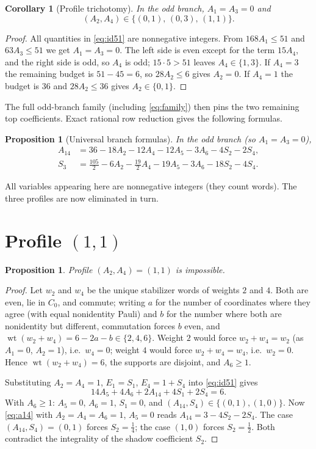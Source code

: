 \documentclass[11pt]{amsart}
\newtheorem{proposition}[theorem]{Proposition}
\newtheorem{corollary}[theorem]{Corollary}
\theoremstyle{definition}
\theoremstyle{remark}
\DeclareMathOperator{\wt}{wt}
\begin{document}
\begin{corollary}[Profile trichotomy]\label{cor:profiles}
In the odd branch, $A_1=A_3=0$ and
\[
(A_2,A_4)\in\{(0,1),\,(0,3),\,(1,1)\} .
\]
\end{corollary}

\begin{proof}
All quantities in \eqref{eq:id51} are nonnegative integers.  From
$168A_1\le 51$ and $63A_3\le 51$ we get $A_1=A_3=0$.  The left side is
even except for the term $15A_4$, and the right side is odd, so $A_4$ is
odd; $15\cdot 5>51$ leaves $A_4\in\{1,3\}$.  If $A_4=3$ the remaining
budget is $51-45=6$, so $28A_2\le6$ gives $A_2=0$.  If $A_4=1$ the budget
is $36$ and $28A_2\le 36$ gives $A_2\in\{0,1\}$.
\end{proof}

The full odd-branch family (including \eqref{eq:family}) then pins the two
remaining top coefficients.  Exact rational row reduction gives the following formulas.

\begin{proposition}[Universal branch formulas]\label{prop:universal}
In the odd branch (so $A_1=A_3=0$),
\begin{align}
A_{14}&=36-18A_2-12A_4-12A_5-3A_6-4S_2-2S_4 , \label{eq:a14}\\
S_3&=\tfrac{105}{2}-6A_2-\tfrac{19}{2}A_4-19A_5-3A_6-18S_2-4S_4 .
\label{eq:s3}
\end{align}
\end{proposition}

All variables appearing here are nonnegative integers (they count words).
The three profiles are now eliminated in turn.

\section{\texorpdfstring{Profile $(1,1)$}{Profile (1,1)}}\label{sec:p11}

\begin{proposition}\label{prop:p11}
Profile $(A_2,A_4)=(1,1)$ is impossible.
\end{proposition}

\begin{proof}
Let $w_2$ and $w_4$ be the unique stabilizer words of weights $2$ and $4$.
Both are even, lie in $C_0$, and commute; writing $a$ for the number of
coordinates where they agree (with equal nonidentity Pauli) and $b$ for
the number where both are nonidentity but different, commutation forces
$b$ even, and $\wt(w_2+w_4)=6-2a-b\in\{2,4,6\}$.  Weight $2$ would force
$w_2+w_4=w_2$ (as $A_1=0$, $A_2=1$), i.e.\ $w_4=0$; weight $4$ would force
$w_2+w_4=w_4$, i.e.\ $w_2=0$.  Hence $\wt(w_2+w_4)=6$, the supports are
disjoint, and $A_6\ge1$.

Substituting $A_2=A_4=1$, $E_1=S_1$, $E_4=1+S_4$ into \eqref{eq:id51}
gives
\[
14A_5+4A_6+2A_{14}+4S_1+2S_4=6 .
\]
With $A_6\ge1$: $A_5=0$, $A_6=1$, $S_1=0$, and
$(A_{14},S_4)\in\{(0,1),(1,0)\}$.  Now \eqref{eq:a14} with
$A_2=A_4=A_6=1$, $A_5=0$ reads $A_{14}=3-4S_2-2S_4$.  The case
$(A_{14},S_4)=(0,1)$ forces $S_2=\tfrac14$; the case $(1,0)$ forces
$S_2=\tfrac12$.  Both contradict the integrality of the shadow coefficient
$S_2$.
\end{proof}
\end{document}
